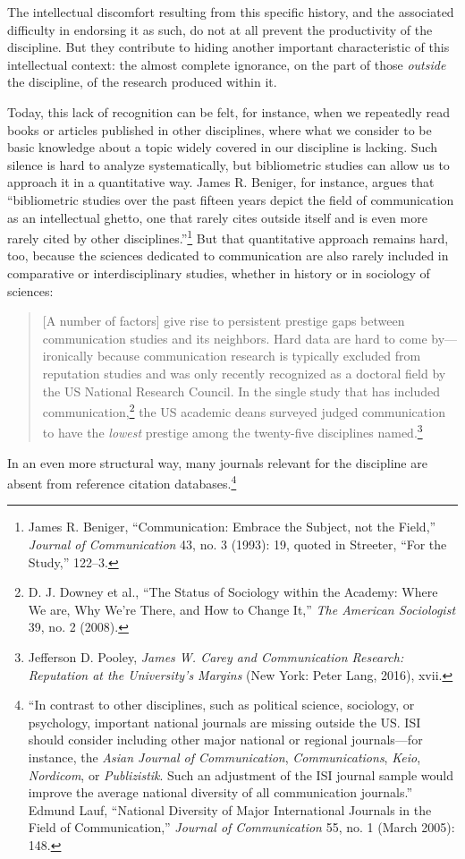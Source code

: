 \documentclass{tufte-handout}
\begin{document}
\noindent The intellectual discomfort resulting from this specific history, and
the associated difficulty in endorsing it as such, do not at all prevent
the productivity of the discipline. But they contribute to hiding
another important characteristic of this intellectual context: the
almost complete ignorance, on the part of those \emph{outside} the
discipline, of the research produced within it.

Today, this lack of recognition can be felt, for instance, when we
repeatedly read books or articles published in other disciplines, where
what we consider to be basic knowledge about a topic widely covered in
our discipline is lacking. Such silence is hard to analyze
systematically, but bibliometric studies can allow us to approach it in
a quantitative way. James R. Beniger, for instance, argues that
``bibliometric studies over the past fifteen years depict the field of
communication as an intellectual ghetto, one that rarely cites outside
itself and is even more rarely cited by other disciplines.''\footnote{James
  R. Beniger, ``Communication: Embrace the Subject, not the Field,''
  \emph{Journal of Communication} 43, no. 3 (1993): 19, quoted in
  Streeter, ``For the Study,'' 122--3.} But that quantitative approach
remains hard, too, because the sciences dedicated to communication are
also rarely included in comparative or interdisciplinary studies,
whether in history or in sociology of sciences:

\begin{quote}
{[}A number of factors{]} give rise to persistent prestige gaps between
communication studies and its neighbors. Hard data are hard to come
by---ironically because communication research is typically excluded
from reputation studies and was only recently recognized as a doctoral
field by the US National Research Council. In the single study that has
included communication,\footnote{D. J. Downey et al., ``The Status of
  Sociology within the Academy: Where We are, Why We're There, and How
  to Change It,'' \emph{The American Sociologist} 39, no. 2 (2008).} the
US academic deans surveyed judged communication to have the
\emph{lowest} prestige among the twenty-five disciplines
named.\footnote{Jefferson D. Pooley, \emph{James W. Carey and
  Communication Research: Reputation at the University's Margins} (New
  York: Peter Lang, 2016), xvii.}
\end{quote}

\noindent In an even more structural way, many journals relevant for the
discipline are absent from reference citation databases.\footnote{``In
  contrast to other disciplines, such as political science, sociology,
  or psychology, important national journals are missing outside the US.
  ISI should consider including other major national or regional
  journals---for instance, the \emph{Asian Journal of Communication},
  \emph{Communications}, \emph{Keio}, \emph{Nordicom}, or
  \emph{Publizistik}. Such an adjustment of the ISI journal sample would
  improve the average national diversity of all communication
  journals.'' Edmund Lauf, ``National Diversity of Major International
  Journals in the Field of Communication,'' \emph{Journal of
  Communication} 55, no. 1 (March 2005): 148.}
\end{document}
